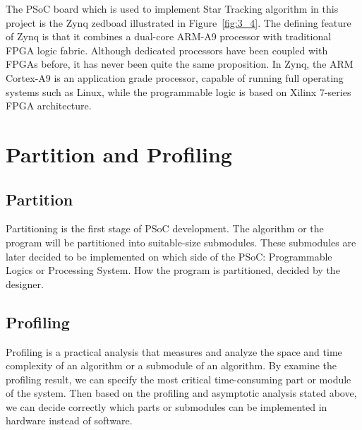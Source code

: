 
\noindent The PSoC board which is used to implement Star Tracking algorithm in this project is the Zynq zedboad illustrated in Figure~\ref{fig:3_4}. The defining feature of Zynq is that it combines a dual-core ARM-A9 processor with traditional FPGA logic fabric\cite{Xilinx}. Although dedicated processors have been coupled with FPGAs before, it has never been quite the same proposition. In Zynq, the ARM Cortex-A9 is an application grade processor, capable of running full operating systems such as Linux, while the programmable logic is based on Xilinx 7-series FPGA architecture. \\


\section{Partition and Profiling}

\subsection{Partition}

Partitioning is the first stage of PSoC development. The algorithm or the program will be partitioned into suitable-size submodules. These submodules are later decided to be implemented on which side of the PSoC: Programmable Logics or Processing System. How the program is partitioned, decided by the designer. \\


\subsection{Profiling}

Profiling is a practical analysis that measures and analyze the space and time complexity of an algorithm or a submodule of an algorithm. By examine the profiling result, we can specify the most critical time-consuming part or module of the system. Then based on the profiling and asymptotic analysis stated above, we can decide correctly which parts or submodules can be implemented in hardware instead of software. \\

